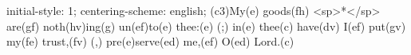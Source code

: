 initial-style: 1;
centering-scheme: english;
(c3)My(e) goods(fh) <sp>*</sp> are(gf) noth(hv)ing(g) un(ef)to(e) thee:(e) (;) in(e) thee(c) have(dv) I(ef) put(gv) my(fe) trust,(fv) (,) pre(e)serve(ed) me,(ef) O(ed) Lord.(c)
